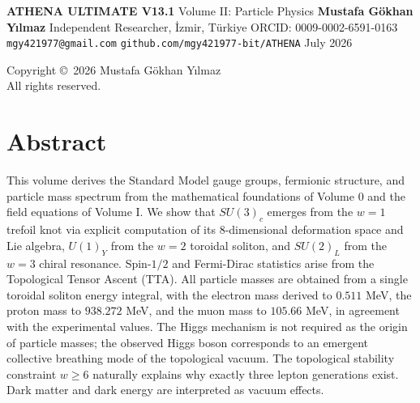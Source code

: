\documentclass[12pt,oneside]{book}
\begin{document}
\frontmatter

\begin{titlepage}
\centering
\vspace*{1cm}
{\Huge\bfseries ATHENA ULTIMATE V13.1}
\vspace{0.5cm}
{\Large Volume II: Particle Physics}
\vspace{2cm}
{\Large \textbf{Mustafa Gökhan Yılmaz}}
\vspace{0.3cm}
{\large Independent Researcher, İzmir, Türkiye}
\vspace{0.2cm}
{\large ORCID: 0009-0002-6591-0163}
\vspace{0.2cm}
{\large \texttt{mgy421977@gmail.com}}
\vspace{0.2cm}
{\large \texttt{github.com/mgy421977-bit/ATHENA}}
\vspace{2cm}
{\large July 2026}
\vfill
\end{titlepage}

\newpage
\thispagestyle{empty}
\vspace*{\fill}
\begin{center}
Copyright \copyright\ 2026 Mustafa Gökhan Yılmaz\\
All rights reserved.
\end{center}
\vspace*{\fill}

\chapter*{Abstract}

This volume derives the Standard Model gauge groups, fermionic structure, and particle mass spectrum from the mathematical foundations of Volume 0 and the field equations of Volume I. We show that $SU(3)_c$ emerges from the $w=1$ trefoil knot via explicit computation of its 8-dimensional deformation space and Lie algebra, $U(1)_Y$ from the $w=2$ toroidal soliton, and $SU(2)_L$ from the $w=3$ chiral resonance. Spin-$1/2$ and Fermi-Dirac statistics arise from the Topological Tensor Ascent (TTA). All particle masses are obtained from a single toroidal soliton energy integral, with the electron mass derived to $0.511$ MeV, the proton mass to $938.272$ MeV, and the muon mass to $105.66$ MeV, in agreement with the experimental values. The Higgs mechanism is not required as the origin of particle masses; the observed Higgs boson corresponds to an emergent collective breathing mode of the topological vacuum. The topological stability constraint $w \geq 6$ naturally explains why exactly three lepton generations exist. Dark matter and dark energy are interpreted as vacuum effects.
\end{document}
